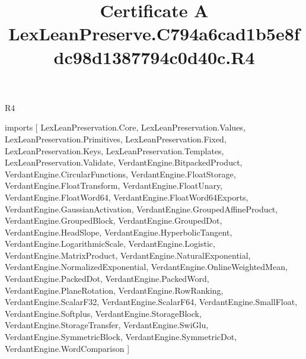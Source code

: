 \begin{lexlean}{R4}
\title{Certificate A LexLeanPreserve.C794a6cad1b5e8fdc98d1387794c0d40c.R4}
\begin{coremodule}
imports [
  LexLeanPreservation.Core,
  LexLeanPreservation.Values,
  LexLeanPreservation.Primitives,
  LexLeanPreservation.Fixed,
  LexLeanPreservation.Keys,
  LexLeanPreservation.Templates,
  LexLeanPreservation.Validate,
  VerdantEngine.BitpackedProduct,
  VerdantEngine.CircularFunctions,
  VerdantEngine.FloatStorage,
  VerdantEngine.FloatTransform,
  VerdantEngine.FloatUnary,
  VerdantEngine.FloatWord64,
  VerdantEngine.FloatWord64Exports,
  VerdantEngine.GaussianActivation,
  VerdantEngine.GroupedAffineProduct,
  VerdantEngine.GroupedBlock,
  VerdantEngine.GroupedDot,
  VerdantEngine.HeadSlope,
  VerdantEngine.HyperbolicTangent,
  VerdantEngine.LogarithmicScale,
  VerdantEngine.Logistic,
  VerdantEngine.MatrixProduct,
  VerdantEngine.NaturalExponential,
  VerdantEngine.NormalizedExponential,
  VerdantEngine.OnlineWeightedMean,
  VerdantEngine.PackedDot,
  VerdantEngine.PackedWord,
  VerdantEngine.PlaneRotation,
  VerdantEngine.RowRanking,
  VerdantEngine.ScalarF32,
  VerdantEngine.ScalarF64,
  VerdantEngine.SmallFloat,
  VerdantEngine.Softplus,
  VerdantEngine.StorageBlock,
  VerdantEngine.StorageTransfer,
  VerdantEngine.SwiGlu,
  VerdantEngine.SymmetricBlock,
  VerdantEngine.SymmetricDot,
  VerdantEngine.WordComparison
]


\end{coremodule}
\end{lexlean}
